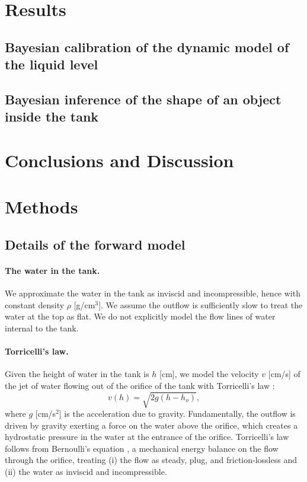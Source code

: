 \documentclass[openacc]{rsproca_new}%
\begin{document}
\section{Results}
\subsection{Bayesian calibration of the dynamic model of the liquid level}

\subsection{Bayesian inference of the shape of an object inside the tank}

\section{Conclusions and Discussion}

\section{Methods}

\subsection{Details of the forward model}
\paragraph{The water in the tank.} We approximate the water in the tank as inviscid and incompressible, hence with constant density $\rho$ [g/cm$^3$]. 
We assume the outflow is sufficiently slow to treat the water at the top as flat.
We do not explicitly model the flow lines of water internal to the tank.

\paragraph{Torricelli's law.} Given the height of water in the tank is $h$ [cm], we model the velocity $v$ [cm/s] of the jet of water flowing out of the orifice of the tank with Torricelli's law \cite{d2021torricelli}:
\begin{equation}
	v(h)=  \sqrt{2 g(h-h_o)}, \label{eq:Toricelli}
\end{equation} where $g$ [cm/s$^2$] is the acceleration due to gravity. 
Fundamentally, the outflow is driven by gravity exerting a force on the water above the orifice, which creates a hydrostatic pressure in the water at the entrance of the orifice. 
Torricelli's law follows from Bernoulli's equation \cite{welty2020fundamentals}, a mechanical energy balance on the flow through the orifice, treating (i) the flow as steady, plug, and friction-lossless and (ii) the water as inviscid and incompressible.
\end{document}
